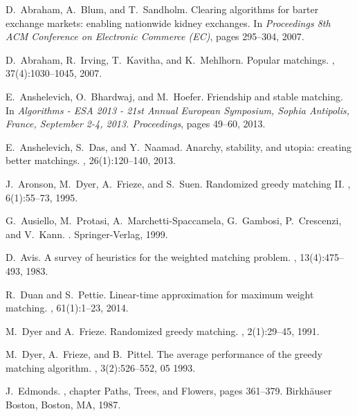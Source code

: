 \documentclass[a4paper,11pt]{article}
\begin{document}
{\small 
\begin{thebibliography}{10}

D.~Abraham, A.~Blum, and T.~Sandholm.
\newblock Clearing algorithms for barter exchange markets: enabling nationwide
  kidney exchanges.
\newblock In {\em Proceedings 8th {ACM} Conference on Electronic Commerce
  ({EC})}, pages 295--304, 2007.

D.~Abraham, R.~Irving, T.~Kavitha, and K.~Mehlhorn.
\newblock Popular matchings.
, 37(4):1030--1045, 2007.

E.~Anshelevich, O.~Bhardwaj, and M.~Hoefer.
\newblock Friendship and stable matching.
\newblock In {\em Algorithms - {ESA} 2013 - 21st Annual European Symposium,
  Sophia Antipolis, France, September 2-4, 2013. Proceedings}, pages 49--60,
  2013.

E.~Anshelevich, S.~Das, and Y.~Naamad.
\newblock Anarchy, stability, and utopia: creating better matchings.
, 26(1):120--140,
  2013.

J.~Aronson, M.~Dyer, A.~Frieze, and S.~Suen.
\newblock Randomized greedy matching {II}.
, 6(1):55--73, 1995.

G.~Ausiello, M.~Protasi, A.~Marchetti-Spaccamela, G.~Gambosi, P.~Crescenzi, and
  V.~Kann.
.
\newblock Springer-Verlag, 1999.

D.~Avis.
\newblock A survey of heuristics for the weighted matching problem.
, 13(4):475--493, 1983.

R.~Duan and S.~Pettie.
\newblock Linear-time approximation for maximum weight matching.
, 61(1):1--23, 2014.

M.~Dyer and A.~Frieze.
\newblock Randomized greedy matching.
, 2(1):29--45, 1991.

M.~Dyer, A.~Frieze, and B.~Pittel.
\newblock The average performance of the greedy matching algorithm.
, 3(2):526--552, 05 1993.

J.~Edmonds.
, chapter Paths, Trees, and
  Flowers, pages 361--379.
\newblock Birkh{\"a}user Boston, Boston, MA, 1987.


\end{thebibliography}}
\end{document}
